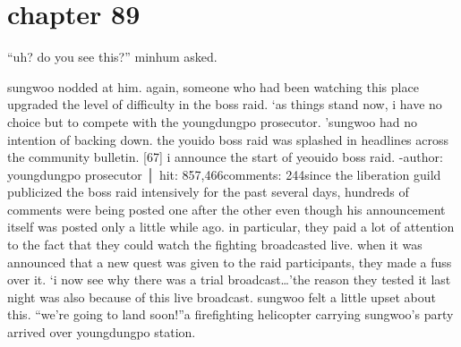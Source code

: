 \section{chapter 89}

                            “uh? do you see this?” minhum asked.





sungwoo nodded at him.
again, someone who had been watching this place upgraded the level of difficulty in the boss raid.
‘as things stand now, i have no choice but to compete with the youngdungpo prosecutor.
’sungwoo had no intention of backing down.
the youido boss raid was splashed in headlines across the community bulletin.
[67] i announce the start of yeouido boss raid.
-author: youngdungpo prosecutor │ hit: 857,466comments: 244since the liberation guild publicized the boss raid intensively for the past several days, hundreds of comments were being posted one after the other even though his announcement itself was posted only a little while ago.
in particular, they paid a lot of attention to the fact that they could watch the fighting broadcasted live.
 when it was announced that a new quest was given to the raid participants, they made a fuss over it.
‘i now see why there was a trial broadcast…’the reason they tested it last night was also because of this live broadcast.
 sungwoo felt a little upset about this.
“we’re going to land soon!”a firefighting helicopter carrying sungwoo’s party arrived over youngdungpo station.

